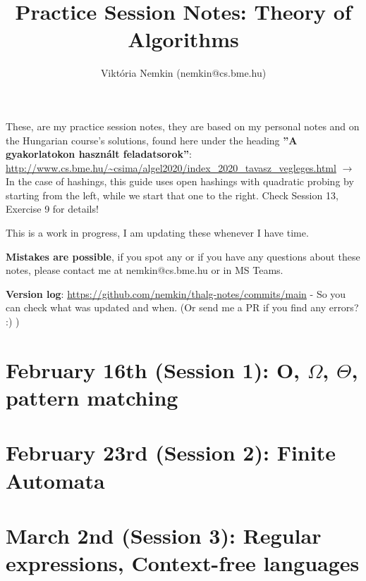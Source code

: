 \documentclass[a4paper]{article}
\author{Viktória Nemkin (nemkin@cs.bme.hu)}
\title{Practice Session Notes: Theory of Algorithms}
\newcommand{\titlemath}[1]{\texorpdfstring{#1}{Lg}}
\begin{document}
\maketitle

These, are my practice session notes, they are based on my personal notes and on the Hungarian course's solutions, found here under the heading \textbf{''A gyakorlatokon használt feladatsorok''}:\\ \url{http://www.cs.bme.hu/~csima/algel2020/index_2020_tavasz_vegleges.html} $\rightarrow$ In the case of hashings, this guide uses open hashings with quadratic probing by starting from the left, while we start that one to the right. Check Session 13, Exercise 9 for details!

This is a work in progress, I am updating these whenever I have time.

\textbf{Mistakes are possible}, if you spot any or if you have any questions about these notes, please contact me at nemkin@cs.bme.hu or in MS Teams.

\textbf{Version log}: \href{https://github.com/nemkin/thalg-notes/commits/main}{https://github.com/nemkin/thalg-notes/commits/main} - So you can check what was updated and when. (Or send me a PR if you find any errors? :) )

\tableofcontents
\pagebreak

\section{February 16th (Session 1): O, \titlemath{$\Omega$, $\Theta$}, pattern matching}
\pagebreak
\pagebreak
\pagebreak
\pagebreak
\pagebreak
\pagebreak
\pagebreak
\pagebreak
\pagebreak
\pagebreak
\pagebreak
\pagebreak

\section{February 23rd (Session 2): Finite Automata}
\pagebreak
\pagebreak
\pagebreak
\pagebreak
\pagebreak
\pagebreak
\pagebreak
\pagebreak
\pagebreak
\pagebreak
\pagebreak
\pagebreak
\pagebreak

\section{March 2nd (Session 3): Regular expressions, Context-free languages}
\pagebreak
\pagebreak
\pagebreak
\pagebreak
\pagebreak
\pagebreak
\pagebreak
\pagebreak
\pagebreak
\pagebreak
\pagebreak
\pagebreak
\end{document}

